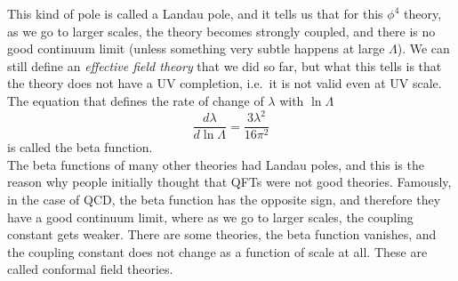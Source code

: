 \documentclass[11pt]{article}
\numberwithin{equation}{section}
\begin{document}
\begin{figure}[H]
    \centering 
\end{figure}

This kind of pole is called a Landau pole, and it tells us that for this \(\phi^4\) theory, as we go to larger scales, the theory becomes strongly coupled, and there is no good continuum limit (unless something very subtle happens at large \(\Lambda\)). We can still define an \textit{effective field theory} that we did so far, but what this tells is that the theory does not have a UV completion, i.e.\ it is not valid even at UV scale.\\

The equation that defines the rate of change of \(\lambda\) with \(\ln\Lambda\)
\begin{equation*}
    \frac{d\lambda}{d\ln\Lambda} = \frac{3\lambda^2}{16\pi^2}
\end{equation*}
is called the beta function. \\

The beta functions of many other theories had Landau poles, and this is the reason why people initially thought that QFTs were not good theories. Famously, in the case of QCD, the beta function has the opposite sign, and therefore they have a good continuum limit, where as we go to larger scales, the coupling constant gets weaker. There are some theories, the beta function vanishes, and the coupling constant does not change as a function of scale at all. These are called conformal field theories.\\
\end{document}
